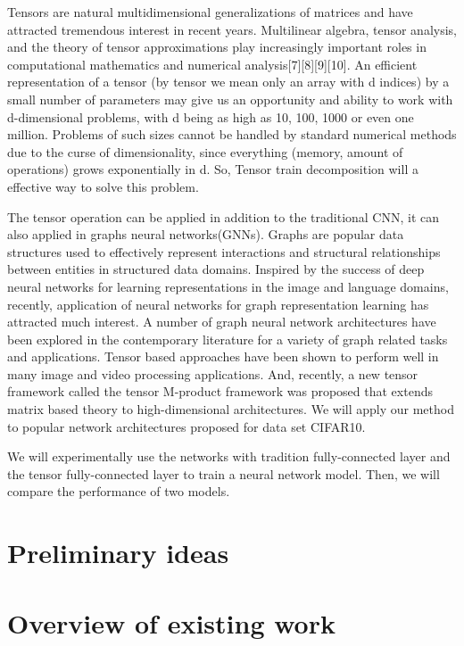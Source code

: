 \documentclass[onecolumn, conference]{IEEEtran}
\begin{document}
Tensors are natural multidimensional generalizations of matrices and have attracted tremendous interest in recent years. Multilinear algebra, tensor analysis, and the theory of tensor approximations play increasingly important roles in computational mathematics and numerical analysis[7][8][9][10]. An efficient representation of a tensor (by tensor we mean only an array with d indices) by a small number of parameters may give us an opportunity and ability to work with d-dimensional problems, with d being as high as 10, 100, 1000 or even one million. Problems of such sizes cannot be handled by standard numerical methods due to the curse of dimensionality, since everything (memory, amount of operations) grows exponentially in d. So, Tensor train decomposition will a effective way to solve this problem. 
\par The tensor operation can be applied in addition to the traditional CNN, it can also applied in graphs neural networks(GNNs). Graphs are popular data structures used to effectively represent interactions and structural relationships between entities in structured data domains. Inspired by the success of deep neural networks for learning representations in the image and language domains, recently, application of neural networks for graph representation learning has attracted much interest. A number of graph neural network architectures have been explored in the contemporary literature for a variety of graph related tasks and applications. Tensor based approaches have been shown to perform well in many image and video processing applications. And, recently, a new tensor framework called the tensor M-product framework was proposed that extends matrix based theory to high-dimensional architectures. 
We will apply our method to popular network architectures proposed for data set CIFAR10. 
\par We will experimentally use the networks with tradition fully-connected layer and the tensor fully-connected layer to train a neural network model. Then, we will compare the performance of two models.


\section{Preliminary ideas}

\par 


\par 

\section{Overview of existing work}
\end{document}

